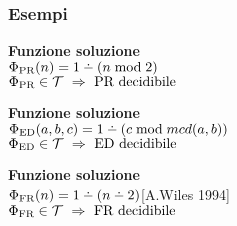 \subsubsection*{Esempi}

\begin{minipage}{.55\textwidth}
    \begin{flushright}
    \end{flushright}
\end{minipage}
\begin{minipage}{.02\textwidth}\phantom{x}\end{minipage}
\begin{minipage}{.41\textwidth}
    \textbf{Funzione soluzione}\\[.5em]
    $\fsol[\text{PR}](n) = 1\dotminus(n\bmod{2})$\\[.5em]
    $ \fsol[\text{PR}]\in\ricTot\ \Rightarrow\ \text{PR decidibile} $
\end{minipage}

\begin{minipage}{.55\textwidth}
    \begin{flushright}
    \end{flushright}
\end{minipage}
\begin{minipage}{.02\textwidth}\phantom{x}\end{minipage}
\begin{minipage}{.41\textwidth}
    \textbf{Funzione soluzione}\\[.5em]
    $\fsol[\text{ED}](a,b,c) = 1\dotminus(c\bmod{mcd(a,b)})$\\[.5em]
    $ \fsol[\text{ED}]\in\ricTot\ \Rightarrow\ \text{ED decidibile} $
\end{minipage}

\begin{minipage}{.55\textwidth}
    \begin{flushright}
    \end{flushright}
\end{minipage}
\begin{minipage}{.02\textwidth}\phantom{x}\end{minipage}
\begin{minipage}{.41\textwidth}
    \textbf{Funzione soluzione}\\[.5em]
    $\fsol[\text{FR}](n) = 1\dotminus(n\dotminus 2)$\hspace{1em}[A.Wiles 1994]\\[.5em]
    $ \fsol[\text{FR}]\in\ricTot\ \Rightarrow\ \text{FR decidibile} $
\end{minipage}

